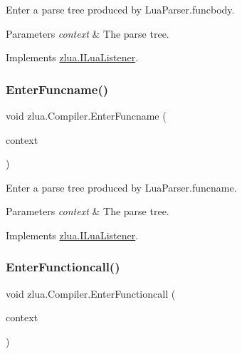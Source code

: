 Enter a parse tree produced by Lua\+Parser.\+funcbody. 


\begin{DoxyParams}{Parameters}
{\em context} & The parse tree.\\
\hline
\end{DoxyParams}


Implements \mbox{\hyperlink{interfacezlua_1_1_i_lua_listener_afb6c93f652b5230dbe2972642281f66b}{zlua.\+I\+Lua\+Listener}}.

\mbox{\label{classzlua_1_1_compiler_a0da2d547d2333616052b776e192eaae5}} 
\subsubsection{\texorpdfstring{Enter\+Funcname()}{EnterFuncname()}}
{\footnotesize\ttfamily void zlua.\+Compiler.\+Enter\+Funcname (\begin{DoxyParamCaption}\item[{\mbox{[}\+Not\+Null\mbox{]} \mbox{\hyperlink{classzlua_1_1_lua_parser_1_1_funcname_context}{Lua\+Parser.\+Funcname\+Context}}}]{context }\end{DoxyParamCaption})}



Enter a parse tree produced by Lua\+Parser.\+funcname. 


\begin{DoxyParams}{Parameters}
{\em context} & The parse tree.\\
\hline
\end{DoxyParams}


Implements \mbox{\hyperlink{interfacezlua_1_1_i_lua_listener_a17d342070a88fadc98dec2456e2ba0dc}{zlua.\+I\+Lua\+Listener}}.

\mbox{\label{classzlua_1_1_compiler_a17169577cf49b4387d6f65f07354e370}} 
\subsubsection{\texorpdfstring{Enter\+Functioncall()}{EnterFunctioncall()}}
{\footnotesize\ttfamily void zlua.\+Compiler.\+Enter\+Functioncall (\begin{DoxyParamCaption}\item[{\mbox{[}\+Not\+Null\mbox{]} \mbox{\hyperlink{classzlua_1_1_lua_parser_1_1_functioncall_context}{Lua\+Parser.\+Functioncall\+Context}}}]{context }\end{DoxyParamCaption})}



